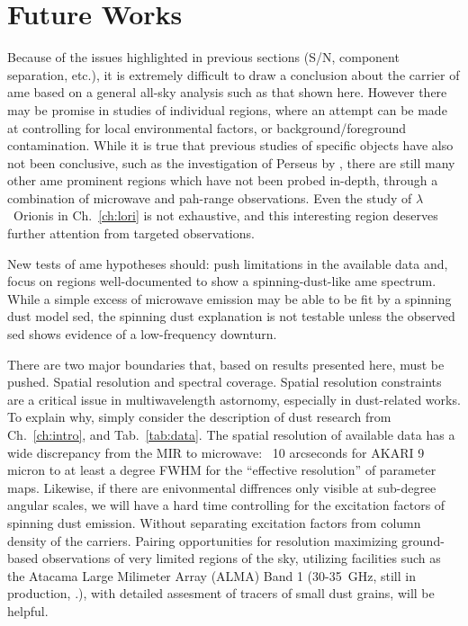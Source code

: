               \section{Future Works}
                  Because of the issues highlighted in previous sections (S/N, component separation, etc.), it is extremely difficult to draw a conclusion about the carrier of \acrshort{ame} based on a general all-sky analysis such as that shown here. However there may be promise in studies of individual regions, where an attempt can be made at controlling for local environmental factors, or background/foreground contamination. While it is true that previous studies of specific objects have also not been conclusive, such as the investigation of Perseus by \cite{tibbs11}, there are still many other \acrshort{ame} prominent regions which have not been probed in-depth, through a combination of microwave and \acrshort{pah}-range observations. Even the study of $\lambda$~Orionis in Ch.~\ref{ch:lori} is not exhaustive, and this interesting region deserves further attention from targeted observations.

                New tests of \acrshort{ame} hypotheses should: push limitations in the available data and, focus on regions well-documented to show a spinning-dust-like \acrshort{ame} spectrum. While a simple excess of microwave emission may be able to be fit by a spinning dust model \acrshort{sed}, the spinning dust explanation is not testable unless the observed \acrshort{sed} shows evidence of a low-frequency downturn.

                There are two major boundaries that, based on results presented here, must be pushed. Spatial resolution and spectral coverage.
                Spatial resolution constraints are a critical issue in multiwavelength astornomy, especially in dust-related works. To explain why, simply consider the description of dust research from Ch.~\ref{ch:intro}, and Tab.~\ref{tab:data}. The spatial resolution of available data has a wide discrepancy from the MIR to microwave: ~10 arcseconds for AKARI 9 micron to at least a degree FWHM for the ``effective resolution'' of parameter maps. Likewise, if there are enivonmental diffrences only visible at sub-degree angular scales, we will have a hard time controlling for the excitation factors of spinning dust emission. Without separating excitation factors from column density of the carriers. Pairing opportunities for resolution maximizing ground-based observations of very limited regions of the sky, utilizing facilities such as the Atacama Large Milimeter Array (ALMA) Band 1 (30-35~GHz, still in production, \cite{huang16}.), with detailed assesment of tracers of small dust grains, will be helpful.

